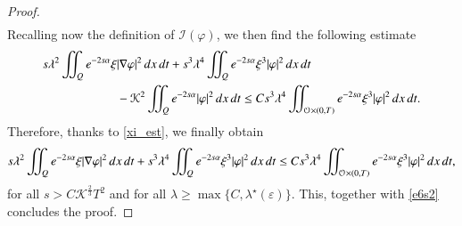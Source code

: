 \documentclass[preprint,1p]{elsarticle}
\newcommand{\intd}{\displaystyle\int \kern -7pt \int}
\begin{document}
\begin{proof}
\begin{align*}
\end{align*}
Recalling now the definition of $\mathcal{I}(\varphi)$, we then find the following estimate
\begin{align*}
	s\lambda^2\intd_Q e^{-2s\alpha}\xi & |\nabla \varphi|^2\,dx\,dt + s^3\lambda^4\intd_Q e^{-2s\alpha}\xi^3|\varphi|^2\,dx\,dt 
	\\
	&- \mathcal{K}^2\intd_Q e^{-2s\alpha}|\varphi|^2\,dx\,dt \leq C s^3\lambda^4\intd_{\mathcal O\times(0,T)} e^{-2s\alpha}\xi^3 |\varphi|^2\,dx\,dt.
\end{align*}
Therefore, thanks to \eqref{xi_est}, we finally obtain
\begin{align*}
	s\lambda^2\intd_Q e^{-2s\alpha}\xi |\nabla \varphi|^2\,dx\,dt + s^3\lambda^4\intd_Q e^{-2s\alpha}\xi^3|\varphi|^2\,dx\,dt \leq C s^3\lambda^4\intd_{\mathcal O\times(0,T)} e^{-2s\alpha}\xi^3 |\varphi|^2\,dx\,dt,
\end{align*}
for all $s>C\mathcal{K}^{\frac 23}T^2$ and for all $\lambda\geq\max\{C,\lambda^\star(\varepsilon)\}$. This, together with \eqref{e6s2} concludes the proof.
\end{proof}
%
\end{document}
